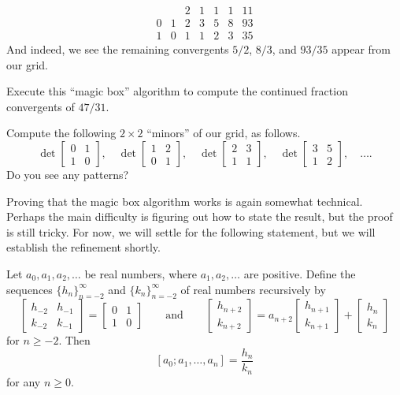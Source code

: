 \documentclass[../notes.tex]{subfiles}
\begin{document}
\[\begin{array}{cc|ccccc}
	&     & 2 & 1 & 1 & 1 & 11 \\\hline
	0 & 1 & 2 & 3 & 5 & 8 & 93\\
	1 & 0 & 1 & 1 & 2 & 3 & 35
\end{array}\]
And indeed, we see the remaining convergents $5/2$, $8/3$, and $93/35$ appear from our grid.
\begin{exe}
	Execute this ``magic box'' algorithm to compute the continued fraction convergents of $47/31$.
\end{exe}
\begin{exe} \label{exe:magic-box-minor}
	Compute the following $2\times2$ ``minors'' of our grid, as follows.
	\[\det\begin{bmatrix}
		0 & 1 \\
		1 & 0
	\end{bmatrix},\quad\det\begin{bmatrix}
		1 & 2 \\
		0 & 1
	\end{bmatrix},\quad\det\begin{bmatrix}
		2 & 3 \\
		1 & 1
	\end{bmatrix},\quad\det\begin{bmatrix}
		3 & 5 \\
		1 & 2
	\end{bmatrix},\quad\ldots.\]
	Do you see any patterns?
\end{exe}
Proving that the magic box algorithm works is again somewhat technical. Perhaps the main difficulty is figuring out how to state the result, but the proof is still tricky. For now, we will settle for the following statement, but we will establish the refinement  shortly.
\begin{proposition} \label{prop:magic-box}
	Let $a_0,a_1,a_2,\ldots$ be real numbers, where $a_1,a_2,\ldots$ are positive. Define the sequences $\{h_n\}_{n=-2}^\infty$ and $\{k_n\}_{n=-2}^\infty$ of real numbers recursively by
	\[\begin{bmatrix}
		h_{-2} & h_{-1} \\
		k_{-2} & k_{-1}
	\end{bmatrix}=\begin{bmatrix}
		0 & 1 \\
		1 & 0
	\end{bmatrix}\qquad\text{and}\qquad\begin{bmatrix}
		h_{n+2} \\
		k_{n+2}
	\end{bmatrix}=a_{n+2}\begin{bmatrix}
		h_{n+1} \\
		k_{n+1}
	\end{bmatrix}+\begin{bmatrix}
		h_n \\
		k_n
	\end{bmatrix}\]
	for $n\ge-2$. Then
	\[[a_0;a_1,\ldots,a_n]=\frac{h_n}{k_n}\]
	for any $n\ge0$.
\end{proposition}
\end{document}
